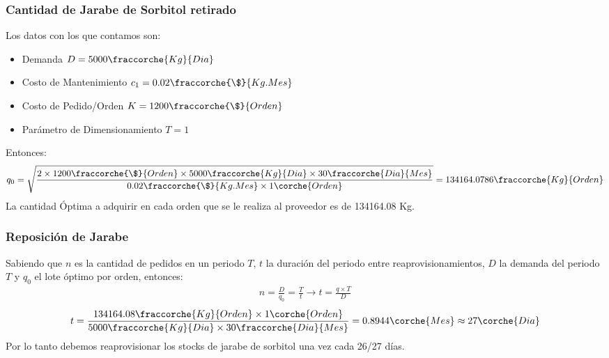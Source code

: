 \begin{homeworkProblem}
\subsubsection{Cantidad de Jarabe de Sorbitol retirado}
Los datos con los que contamos son:
\begin{itemize}
    \item Demanda $D=5000\fraccorche{Kg}{Dia}$
    \item Costo de Mantenimiento $c_1=0.02\fraccorche{\$}{Kg.Mes}$
    \item Costo de Pedido/Orden $K=1200\fraccorche{\$}{Orden}$
    \item Parámetro de Dimensionamiento $T=1$
\end{itemize}
Entonces:
\begin{align*}
    q_0=\sqrt{
        \frac{
            2\times 1200\fraccorche{\$}{Orden}\times 5000\fraccorche{Kg}{Dia} \times 30\fraccorche{Dia}{Mes}
            }{
                0.02\fraccorche{\$}{Kg.Mes}\times 1\corche{Orden}
            }
        }
        =
        134164.0786\fraccorche{Kg}{Orden}
\end{align*}
La cantidad Óptima a adquirir en cada orden que se le realiza al proveedor es de 134164.08 Kg.

\subsubsection{Reposición de Jarabe}
Sabiendo que $n$ es la cantidad de pedidos en un periodo $T$, $t$ la duración del periodo entre reaprovisionamientos, $D$ la demanda del periodo $T$ y $q_0$ el lote óptimo por orden, entonces:
\begin{align*}
    n=\frac{D}{q_0}=\frac{T}{t} \rightarrow t = \frac{q\times T}{D}
\end{align*}
\begin{align*}
    t = \frac{
            134164.08\fraccorche{Kg}{Orden}\times 1 \corche{Orden}
        }{
            5000\fraccorche{Kg}{Dia}\times 30\fraccorche{Dia}{Mes}
        } =  0.8944\corche{Mes} \approx 27\corche{Dia}       
\end{align*}
Por lo tanto debemos reaprovisionar los stocks de jarabe de sorbitol una vez cada 26/27 días.


\end{homeworkProblem}
